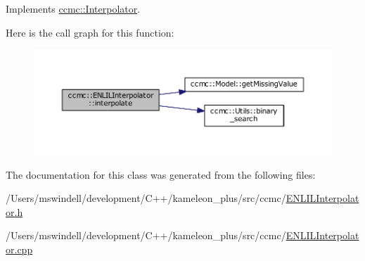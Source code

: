 Implements \hyperlink{classccmc_1_1_interpolator_aa6b272bd53630020d92938ec1e5cfad9}{ccmc\-::\-Interpolator}.



Here is the call graph for this function\-:
\nopagebreak
\begin{figure}[H]
\begin{center}
\leavevmode
\includegraphics[width=350pt]{classccmc_1_1_e_n_l_i_l_interpolator_a92508c6305deec651299b7e70ee3c531_cgraph}
\end{center}
\end{figure}




The documentation for this class was generated from the following files\-:\begin{DoxyCompactItemize}
\item 
/\-Users/mswindell/development/\-C++/kameleon\-\_\-plus/src/ccmc/\hyperlink{_e_n_l_i_l_interpolator_8h}{E\-N\-L\-I\-L\-Interpolator.\-h}\item 
/\-Users/mswindell/development/\-C++/kameleon\-\_\-plus/src/ccmc/\hyperlink{_e_n_l_i_l_interpolator_8cpp}{E\-N\-L\-I\-L\-Interpolator.\-cpp}\end{DoxyCompactItemize}
